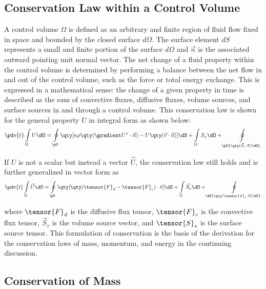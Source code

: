 \subsection{Conservation Law within a Control Volume}

A control volume $\Omega$ is defined as an arbitrary and finite region of fluid flow fixed in space and bounded by the closed surface $d\Omega$. The surface element $dS$ represents a small and finite portion of the surface $d\Omega$ and $\vec{n}$ is the associated outward pointing unit normal vector. The net change of a fluid property within the control volume is determined by performing a balance between the net flow in and out of the control volume, such as the force or total energy exchange. This is expressed in a mathematical sense: the change of a given property in time is described as the sum of convective fluxes, diffusive fluxes, volume sources, and surface sources in and through a control volume. This conservation law is shown for the general property $U$ in integral form as shown below:
%
$$ \pdv{t}\int\limits_{\Omega}{U \dO} = \oint\limits_{\pO}{\qty[\kappa\rho\qty(\gradient U^* \cdot \vec{n}) - U\qty(\vec{v}\cdot\vec{n})]\dS} + \int\limits_\Omega{S_v\dO} + \oint\limits_\pO{\qty(\vec{S}_s\cdot \vec{n})\dS} $$

If $U$ is not a scalar but instead a vector $\vec{U}$, the conservation law still holds and is further generalized in vector form as
%
\begin{equation} \pdv{t}\int\limits_\Omega{\vec{U} \dO} = \oint\limits_{\pO}{\qty[\qty(\tensor{F}_d - \tensor{F}_c)\cdot\vec{n}]\dS} + \int\limits_\Omega{\vec{S}_v\dO} + \oint\limits_\dO{\qty(\tensor{S}_s\cdot\vec{n})\dS} \label{eq:conservation} \end{equation}

\noindent
where $\tensor{F}_d$ is the diffusive flux tensor, $\tensor{F}_c$ is the convective flux tensor, $\vec{S}_v$ is the volume source vector, and $\tensor{S}_s$ is the surface source tensor. This formulation of conservation is the basis of the derivation for the conservation laws of mass, momentum, and energy in the continuing discussion.

\subsection{Conservation of Mass}

